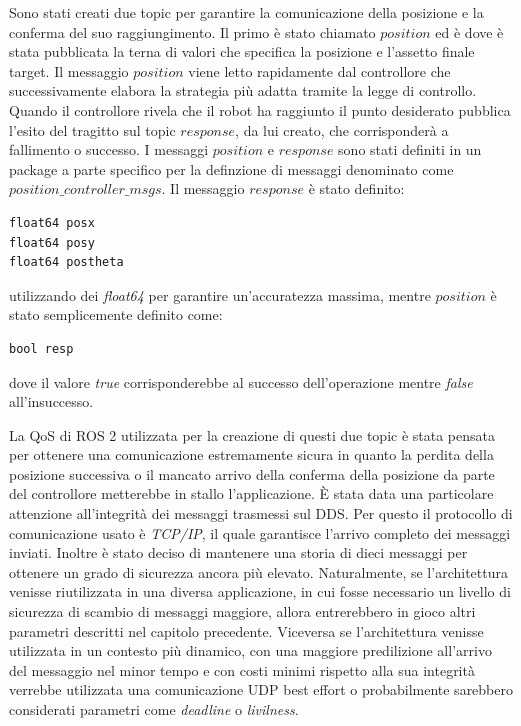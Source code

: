 \documentclass[a4paper,11 pt,oneside]{book}
\theoremstyle{definition}
\begin{document}
Sono stati creati due topic per garantire la comunicazione della posizione e la conferma del suo raggiungimento. Il primo  è stato chiamato $position$ ed è dove è stata pubblicata la terna di valori che specifica la posizione e l'assetto finale target. Il messaggio $position$ viene letto rapidamente dal controllore che successivamente elabora la strategia più adatta tramite la legge di controllo. Quando il controllore rivela che il robot ha raggiunto il punto desiderato pubblica l'esito del tragitto  sul topic $response$, da lui creato, che corrisponderà a fallimento o successo.
I messaggi $position$ e $response$ sono stati definiti in un package a parte specifico per la definzione di messaggi denominato come $position\_controller\_msgs$.
Il messaggio $response$ è stato definito:
\begin{lstlisting}
float64 posx 
float64 posy
float64 postheta
\end{lstlisting}
utilizzando dei \emph{float64} per garantire un'accuratezza massima, mentre $position$ è stato semplicemente definito come:
\begin{lstlisting}
bool resp
\end{lstlisting}
dove il valore \emph{true} corrisponderebbe al successo dell'operazione mentre \emph{false} all'insuccesso.

La QoS di ROS 2 utilizzata per la creazione di questi due topic è stata pensata per ottenere una comunicazione estremamente sicura in quanto la perdita della posizione successiva o il mancato arrivo della conferma della posizione da parte del controllore metterebbe in stallo l'applicazione.
È stata data una particolare attenzione all'integrità dei messaggi trasmessi sul DDS. Per questo il protocollo di comunicazione usato è \emph{TCP/IP}, il quale garantisce l'arrivo completo dei messaggi inviati. Inoltre è stato deciso di mantenere una storia di dieci messaggi per ottenere un grado di sicurezza ancora più elevato. Naturalmente, se l'architettura venisse riutilizzata in una diversa applicazione, in cui fosse necessario un livello di sicurezza di scambio di messaggi maggiore, allora entrerebbero in gioco altri parametri descritti nel capitolo precedente. Viceversa se l'architettura venisse utilizzata in un contesto più dinamico, con una maggiore predilizione all'arrivo del messaggio nel minor tempo e con costi minimi rispetto alla sua integrità verrebbe utilizzata una comunicazione UDP best effort o probabilmente sarebbero considerati parametri come \emph{deadline} o \emph{livilness}.
\end{document}
